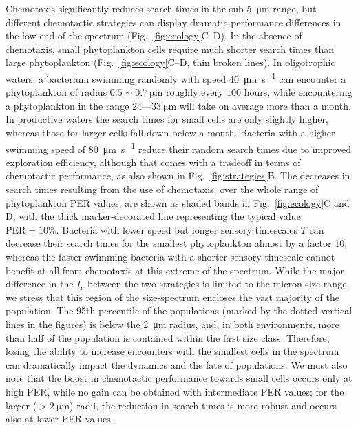 \documentclass[9pt,twocolumn,twoside]{pnas-new}
\begin{document}
Chemotaxis significantly reduces search times in the sub-\SI{5}{\micro\m} range, but different chemotactic strategies can display dramatic performance differences in the low end of the spectrum (Fig.~\ref{fig:ecology}C--D).
In the absence of chemotaxis, small phytoplankton cells require much shorter search times than large phytoplankton (Fig.~\ref{fig:ecology}C--D, thin broken lines).
In oligotrophic waters, a bacterium swimming randomly with speed \SI{40}{\micro\m\per\s} can encounter a phytoplankton of radius $0.5\sim\SI{0.7}{\micro\m}$ roughly every $100$ hours, while encountering a phytoplankton in the range $24\text{---}\SI{33}{\micro\m}$ will take on average more than a month. 
%
In productive waters the search times for small cells are only slightly higher, whereas those for larger cells fall down below a month. Bacteria with a higher swimming speed of \SI{80}{\micro\m\per\s} reduce their random search times due to improved exploration efficiency, although that comes with a tradeoff in terms of chemotactic performance, as also shown in Fig.~\ref{fig:strategies}B.
The decreases in search times resulting from the use of chemotaxis, over the whole range of phytoplankton PER values, are shown as shaded bands in Fig.~\ref{fig:ecology}C and D, with the thick marker-decorated line representing the typical value $\mathrm{PER}=10\%$.
Bacteria with lower speed but longer sensory timescales $T$ can decrease their search times for the smallest phytoplankton almost by a factor 10, whereas the faster swimming bacteria with a shorter sensory timescale cannot benefit at all from chemotaxis at this extreme of the spectrum.
While the major difference in the $I_c$ between the two strategies is limited to the micron-size range, we stress that this region of the size-spectrum encloses the vast majority of the population.
The 95th percentile of the populations (marked by the dotted vertical lines in the figures) is below the \SI{2}{\micro\m} radius, and, in both environments, more than half of the population is contained within the first size class.
Therefore, losing the ability to increase encounters with the smallest cells in the spectrum can dramatically impact the dynamics and the fate of populations.
We must also note that the boost in chemotactic performance towards small cells occurs only at high PER, while no gain can be obtained with intermediate PER values; for the larger ($>\SI{2}{\micro\m}$) radii, the reduction in search times is more robust and occurs also at lower PER values.
\end{document}
